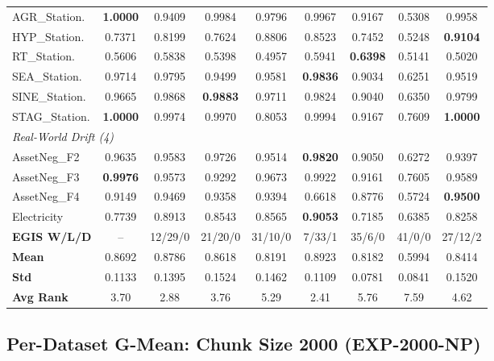 \documentclass[lettersize,10pt]{article}
\begin{document}
\begin{longtable}{lcccccccc}
\midrule
AGR\_Station. & \textbf{1.0000} & 0.9409 & 0.9984 & 0.9796 & 0.9967 & 0.9167 & 0.5308 & 0.9958 \\
HYP\_Station. & 0.7371 & 0.8199 & 0.7624 & 0.8806 & 0.8523 & 0.7452 & 0.5248 & \textbf{0.9104} \\
RT\_Station. & 0.5606 & 0.5838 & 0.5398 & 0.4957 & 0.5941 & \textbf{0.6398} & 0.5141 & 0.5020 \\
SEA\_Station. & 0.9714 & 0.9795 & 0.9499 & 0.9581 & \textbf{0.9836} & 0.9034 & 0.6251 & 0.9519 \\
SINE\_Station. & 0.9665 & 0.9868 & \textbf{0.9883} & 0.9711 & 0.9824 & 0.9040 & 0.6350 & 0.9799 \\
STAG\_Station. & \textbf{1.0000} & 0.9974 & 0.9970 & 0.8053 & 0.9994 & 0.9167 & 0.7609 & \textbf{1.0000} \\
\midrule \multicolumn{9}{l}{\textit{Real-World Drift (4)}}\\
\midrule
AssetNeg\_F2 & 0.9635 & 0.9583 & 0.9726 & 0.9514 & \textbf{0.9820} & 0.9050 & 0.6272 & 0.9397 \\
AssetNeg\_F3 & \textbf{0.9976} & 0.9573 & 0.9292 & 0.9673 & 0.9922 & 0.9161 & 0.7605 & 0.9589 \\
AssetNeg\_F4 & 0.9149 & 0.9469 & 0.9358 & 0.9394 & 0.6618 & 0.8776 & 0.5724 & \textbf{0.9500} \\
Electricity & 0.7739 & 0.8913 & 0.8543 & 0.8565 & \textbf{0.9053} & 0.7185 & 0.6385 & 0.8258 \\
\midrule
\textbf{EGIS W/L/D} & -- & 12/29/0 & 21/20/0 & 31/10/0 & 7/33/1 & 35/6/0 & 41/0/0 & 27/12/2 \\
\textbf{Mean} & 0.8692 & 0.8786 & 0.8618 & 0.8191 & 0.8923 & 0.8182 & 0.5994 & 0.8414 \\
\textbf{Std} & 0.1133 & 0.1395 & 0.1524 & 0.1462 & 0.1109 & 0.0781 & 0.0841 & 0.1520 \\
\textbf{Avg Rank} & 3.70 & 2.88 & 3.76 & 5.29 & 2.41 & 5.76 & 7.59 & 4.62 \\
\bottomrule
\end{longtable}
\normalsize

\subsection{Per-Dataset G-Mean: Chunk Size 2000 (EXP-2000-NP)}
\label{sec:s2_exp_2000_np}
\end{document}
